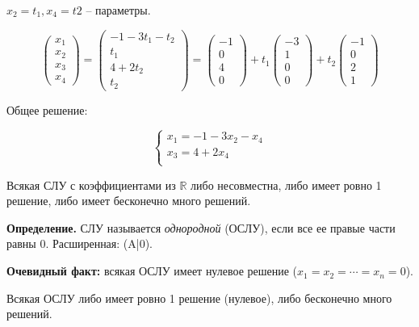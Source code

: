$x_2 = t_1, x_4 = t2$ -- параметры.

\[
	\begin{pmatrix}
    x_1 \\
    x_2 \\
    x_3 \\
    x_4
	\end{pmatrix}
    =
    \begin{pmatrix}
    -1 - 3t_1 - t_2 \\
    t_1 \\
    4 + 2t_2 \\
    t_2
    \end{pmatrix}
    =
    \begin{pmatrix}
    -1\\
    0\\
    4\\
    0
    \end{pmatrix}
    + t_1
    \begin{pmatrix}
    -3\\
    1\\
    0\\
    0
    \end{pmatrix}
    +t_2
    \begin{pmatrix}
    -1\\
    0\\
    2\\
    1
    \end{pmatrix}
\]

Общее решение:

\[
	\left\{
		\begin{aligned}
        x_1 = -1 - 3x_2 - x_4\\
        x_3 = 4 + 2x_4 \\
		\end{aligned}
	\right.
\]

\begin{corollary}
Всякая СЛУ с коэффициентами из $\mathbb{R}$ либо несовместна, либо имеет ровно 1 решение, либо имеет бесконечно много решений.
\end{corollary}

\textbf{Определение.} СЛУ называется \textit{однородной} (ОСЛУ), если все ее правые части равны 0. Расширенная: (A|0). 

\vspace{\baselineskip}
\textbf{Очевидный факт:} всякая ОСЛУ имеет нулевое решение ($x_1 = x_2 = \cdots= x_n = 0$).

\begin{corollary}
Всякая ОСЛУ либо имеет ровно 1 решение (нулевое), либо бесконечно много решений.
\end{corollary}

